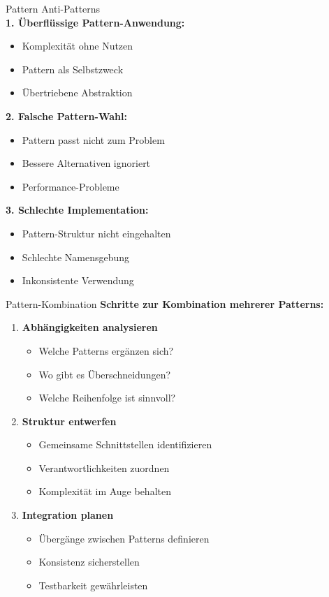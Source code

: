 \begin{KR}{Pattern Anti-Patterns}\\
\textbf{1. Überflüssige Pattern-Anwendung:}
\begin{itemize}
   \item Komplexität ohne Nutzen
   \item Pattern als Selbstzweck
   \item Übertriebene Abstraktion
\end{itemize}

\textbf{2. Falsche Pattern-Wahl:}
\begin{itemize}
   \item Pattern passt nicht zum Problem
   \item Bessere Alternativen ignoriert
   \item Performance-Probleme
\end{itemize}

\textbf{3. Schlechte Implementation:}
\begin{itemize}
   \item Pattern-Struktur nicht eingehalten
   \item Schlechte Namensgebung
   \item Inkonsistente Verwendung
\end{itemize}
\end{KR}



\begin{KR}{Pattern-Kombination}
\textbf{Schritte zur Kombination mehrerer Patterns:}
\begin{enumerate}
    \item \textbf{Abhängigkeiten analysieren}
    \begin{itemize}
        \item Welche Patterns ergänzen sich?
        \item Wo gibt es Überschneidungen?
        \item Welche Reihenfolge ist sinnvoll?
    \end{itemize}
    
    \item \textbf{Struktur entwerfen}
    \begin{itemize}
        \item Gemeinsame Schnittstellen identifizieren
        \item Verantwortlichkeiten zuordnen
        \item Komplexität im Auge behalten
    \end{itemize}
    
    \item \textbf{Integration planen}
    \begin{itemize}
        \item Übergänge zwischen Patterns definieren
        \item Konsistenz sicherstellen
        \item Testbarkeit gewährleisten
    \end{itemize}
\end{enumerate}
\end{KR}



